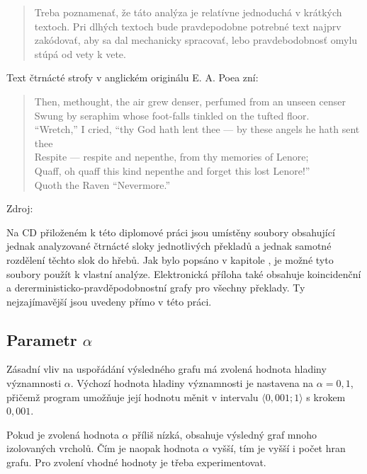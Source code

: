 \documentclass[dp.tex]{subfiles}
\begin{document}
\begin{quote}
Treba poznamenať, že táto analýza je relatívne jednoduchá v krátkých textoch. Pri dlhých textoch bude pravdepodobne potrebné text najprv zakódovať, aby sa dal mechanicky spracovať, lebo pravdebodobnosť omylu stúpá od vety k vete.
\end{quote}

Text čtrnácté strofy v anglickém originálu E. A. Poea zní:

\begin{verse}
 Then, methought, the air grew denser, perfumed from an unseen censer \\
 Swung by seraphim whose foot-falls tinkled on the tufted floor.\\
 “Wretch,” I cried, “thy God hath lent thee — by these angels he hath sent thee \\
 Respite — respite and nepenthe, from thy memories of Lenore; \\
 Quaff, oh quaff this kind nepenthe and forget this lost Lenore!”\\
 Quoth the Raven “Nevermore.” 
\end{verse}
\begin{flushright}
Zdroj: \cite[str.~65]{Poe1990}
\end{flushright}

Na CD přiloženém k této diplomové práci jsou umístěny soubory obsahující jednak analyzované čtrnácté sloky jednotlivých překladů a jednak samotné rozdělení těchto slok do hřebů. Jak bylo popsáno v kapitole , je možné tyto soubory použít k vlastní analýze. Elektronická příloha také obsahuje koincidenční a dererministicko-pravděpodobnostní grafy pro všechny překlady. Ty nejzajímavější jsou uvedeny přímo v této práci.

\subsection{Parametr $\alpha$}

Zásadní vliv na uspořádání výsledného grafu má zvolená hodnota hladiny významnosti $\alpha$. Výchozí hodnota hladiny významnosti je nastavena na $\alpha=0{,}1$, přičemž program umožňuje její hodnotu měnit v intervalu $\langle 0{,}001;1\rangle$ s krokem $0{,}001$.

Pokud je zvolená hodnota $\alpha$ příliš nízká, obsahuje výsledný graf mnoho izolovaných vrcholů. Čím je naopak hodnota $\alpha$ vyšší, tím je vyšší i počet hran grafu. Pro zvolení vhodné hodnoty je třeba experimentovat. 
\end{document}
